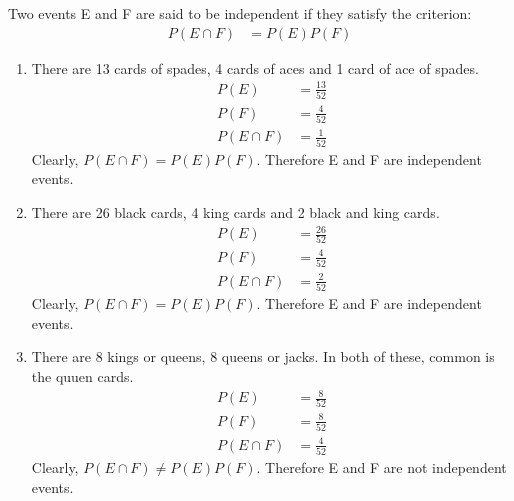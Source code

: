 Two events E and F are said to be independent if they satisfy the criterion:
\begin{align}
P(E \cap F) &= P(E)P(F)
\end{align}
\begin{enumerate}
\item There are 13 cards of spades, 4 cards of aces and 1 card of ace of spades.
\begin{align}
P(E) &= \frac{13}{52}\\
P(F) &= \frac{4}{52}\\
P(E \cap F) &= \frac{1}{52}
\end{align}
Clearly, $P(E \cap F)= P(E)P(F)$. Therefore E and F are independent events.
\item There are 26 black cards, 4 king cards and 2 black and king cards.
\begin{align}
P(E) &= \frac{26}{52}\\
P(F) &= \frac{4}{52}\\
P(E \cap F) &= \frac{2}{52}
\end{align}
Clearly, $P(E \cap F)= P(E)P(F)$. Therefore E and F are independent events.
\item There are 8 kings or queens, 8 queens or jacks. In both of these, common is the quuen cards. 
\begin{align}
P(E) &= \frac{8}{52}\\
P(F) &= \frac{8}{52}\\
P(E \cap F) &= \frac{4}{52}
\end{align}
Clearly, $P(E \cap F) \neq P(E)P(F)$. Therefore E and F are not independent events.
\end{enumerate}

